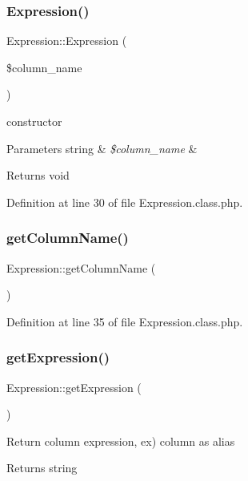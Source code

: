 \subsubsection{\texorpdfstring{Expression()}{Expression()}}
{\footnotesize\ttfamily Expression\+::\+Expression (\begin{DoxyParamCaption}\item[{}]{\$column\+\_\+name }\end{DoxyParamCaption})}

constructor 
\begin{DoxyParams}[1]{Parameters}
string & {\em \$column\+\_\+name} & \\
\hline
\end{DoxyParams}
\begin{DoxyReturn}{Returns}
void 
\end{DoxyReturn}


Definition at line 30 of file Expression.\+class.\+php.

\mbox{\label{classExpression_a1822fc4ae1532c280ed017265aff00d7}} 
\subsubsection{\texorpdfstring{get\+Column\+Name()}{getColumnName()}}
{\footnotesize\ttfamily Expression\+::get\+Column\+Name (\begin{DoxyParamCaption}{ }\end{DoxyParamCaption})}



Definition at line 35 of file Expression.\+class.\+php.

\mbox{\label{classExpression_aac1c43a04af3c8208e48e4a67283ff81}} 
\subsubsection{\texorpdfstring{get\+Expression()}{getExpression()}}
{\footnotesize\ttfamily Expression\+::get\+Expression (\begin{DoxyParamCaption}{ }\end{DoxyParamCaption})}

Return column expression, ex) column as alias \begin{DoxyReturn}{Returns}
string 
\end{DoxyReturn}


